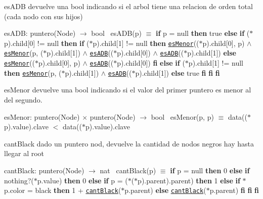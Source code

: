 \begin{DoxyParagraph}{es\+A\+DB}
devuelve una bool indicando si el arbol tiene una relacion de orden total (cada nodo con sus hijos)

es\+A\+DB\+: puntero(\+Node) $\to$ bool~\newline
 es\+A\+D\+B(p) $\equiv$ {\bfseries if} p = null {\bfseries then} true {\bfseries else} {\bfseries if} ($\ast$p).child\mbox{[}0\mbox{]} != null {\bfseries then} {\bfseries if} ($\ast$p).child\mbox{[}1\mbox{]} != null {\bfseries then} \href{axiomas.html#esMenor}{\tt es\+Menor}(($\ast$p).child\mbox{[}0\mbox{]}, p) $\land$ \href{axiomas.html#esMenor}{\tt es\+Menor}(p, ($\ast$p).child\mbox{[}1\mbox{]}) $\land$ \href{axiomas.html#esADB}{\tt es\+A\+DB}(($\ast$p).child\mbox{[}0\mbox{]}) $\land$ \href{axiomas.html#esADB}{\tt es\+A\+DB}(($\ast$p).child\mbox{[}1\mbox{]}) {\bfseries else} \href{axiomas.html#esMenor}{\tt es\+Menor}(($\ast$p).child\mbox{[}0\mbox{]}, p) $\land$ \href{axiomas.html#esADB}{\tt es\+A\+DB}(($\ast$p).child\mbox{[}0\mbox{]}) {\bfseries fi} {\bfseries else} {\bfseries if} ($\ast$p).child\mbox{[}1\mbox{]} != null {\bfseries then} \href{axiomas.html#esMenor}{\tt es\+Menor}(p, ($\ast$p).child\mbox{[}1\mbox{]}) $\land$ \href{axiomas.html#esADB}{\tt es\+A\+DB}(($\ast$p).child\mbox{[}1\mbox{]}) {\bfseries else} true {\bfseries fi} {\bfseries fi} {\bfseries fi} 
\end{DoxyParagraph}


\begin{DoxyParagraph}{es\+Menor}
devuelve una bool indicando si el valor del primer puntero es menor al del segundo.

es\+Menor\+: puntero(\+Node) $\times$ puntero(\+Node) $\to$ bool~\newline
 es\+Menor(p, p\textquotesingle{}) $\equiv$ data(($\ast$p).value).clave $<$ data(($\ast$p).value).clave 
\end{DoxyParagraph}


\begin{DoxyParagraph}{cant\+Black}
dado un puntero nod, devuelve la cantidad de nodos negros hay hasta llegar al root

cant\+Black\+: puntero(\+Node) $\to$ nat~\newline
 cant\+Black(p) $\equiv$ {\bfseries if} p = null {\bfseries then} 0 {\bfseries else} {\bfseries if} nothing?($\ast$p.value) {\bfseries then} 0 {\bfseries else} {\bfseries if} p = ($\ast$($\ast$p).parent).parent) {\bfseries then} 1 {\bfseries else} {\bfseries if} $\ast$p.color = black {\bfseries then} 1 + \href{axiomas.html#cantBlack}{\tt cant\+Black}($\ast$p.parent) {\bfseries else} \href{axiomas.html#cantBlack}{\tt cant\+Black}($\ast$p.parent) {\bfseries fi} {\bfseries fi} {\bfseries fi} 
\end{DoxyParagraph}



